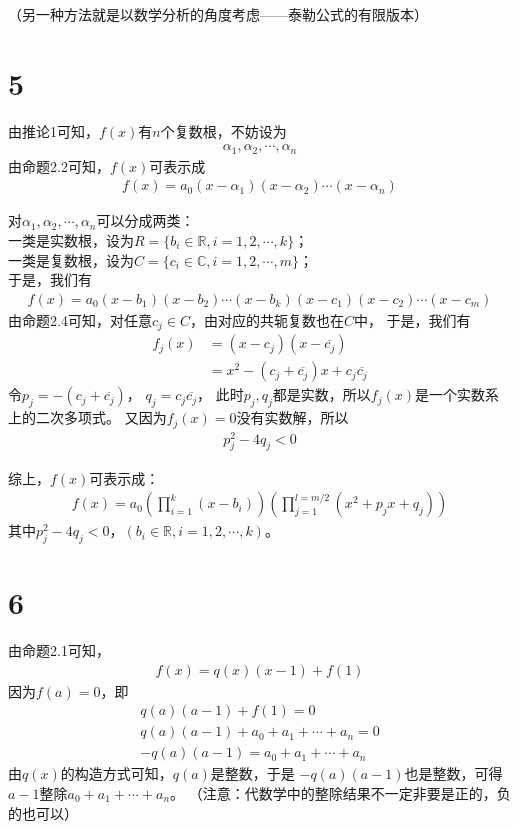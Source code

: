 \documentclass{article}
\begin{document}
（另一种方法就是以数学分析的角度考虑——泰勒公式的有限版本）

\section*{5}

由推论1可知，$f(x)$有$n$个复数根，不妨设为
\begin{align*}
  \alpha_1, \alpha_2, \cdots, \alpha_n
\end{align*}
由命题2.2可知，$f(x)$可表示成
\begin{align*}
  f(x) = a_0(x - \alpha_1)(x - \alpha_2) \cdots (x - \alpha_n)
\end{align*}

对$\alpha_1, \alpha_2, \cdots, \alpha_n$可以分成两类：\\
一类是实数根，设为$R = \{b_i \in \mathbb{R}, i = 1, 2, \cdots, k\}$；\\
一类是复数根，设为$C = \{c_i \in \mathbb{C}, i = 1, 2, \cdots, m\}$；\\
于是，我们有
\begin{align*}
  f(x) = a_0(x - b_1)(x - b_2) \cdots (x - b_k)(x - c_1)(x - c_2) \cdots (x - c_m)
\end{align*}
由命题2.4可知，对任意$c_j \in C$，由对应的共轭复数也在$C$中，
于是，我们有
\begin{align*}
  f_j(x) & = (x - c_j) (x - \overline{c_j})                    \\
         & = x^2 - (c_j + \overline{c_j})x + c_j\overline{c_j}
\end{align*}
令$p_j = - (c_j + \overline{c_j})$， $q_j = c_j\overline{c_j}$，
此时$p_j, q_j$都是实数，所以$f_j(x)$是一个实数系上的二次多项式。
又因为$f_j(x) = 0$没有实数解，所以
\begin{align*}
  p_j^2 - 4q_j < 0
\end{align*}


综上，$f(x)$可表示成：
\begin{align*}
  f(x) = a_0\left(\prod\limits_{i = 1}^k (x - b_i)\right)
  \left(\prod\limits_{j = 1}^{l = m/2} (x^2 + p_j x + q_j)\right)
\end{align*}
其中$p_j^2 - 4q_j < 0$，$(b_i \in \mathbb{R}, i = 1, 2, \cdots, k)$。

\section*{6}

由命题2.1可知，
\begin{align*}
  f(x) = q(x)(x - 1) + f(1)
\end{align*}
因为$f(a) = 0$，即
\begin{align*}
  q(a)(a - 1) + f(1) = 0                     \\
  q(a)(a - 1) + a_0 + a_1 + \cdots + a_n = 0 \\
  - q(a)(a - 1) = a_0 + a_1 + \cdots + a_n
\end{align*}
由$q(x)$的构造方式可知，$q(a)$是整数，于是
$-q(a)(a - 1)$也是整数，可得$a - 1$整除$a_0 + a_1 + \cdots + a_n$。
（注意：代数学中的整除结果不一定非要是正的，负的也可以）
\end{document}

